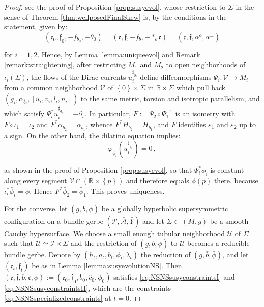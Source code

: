 \documentclass[10pt,reqno,a4paper]{amsart}
\theoremstyle{plain}
\theoremstyle{definition}
\theoremstyle{remark}
\theoremstyle{remark}
\def\cA{\mathcal{A}}
\def\cI{\mathcal{I}}
\def\cP{\mathcal{P}}
\def\frc{\mathfrak{c}}
\def\cU{\mathcal{U}}
\def\fre{\mathfrak{e}}
\renewcommand{\(}{ (}
\renewcommand{\)}{ )}
\newcommand{\frf}{\mathfrak{f}}
\begin{document}
\begin{proof}
\noindent
see the proof of Proposition \ref{prop:susyevol}, whose restriction to $\Sigma$ in the sense of Theorem \ref{thm:wellposedFinalSkew} is, by the conditions in the statement, given by:
\begin{equation*}
(\fre_0,\frf_0,-f_{b_0},-\theta_0) = (\fre,\frf,-f_b,-\ast_{\fre}\frc) = (\fre,\frf,\alpha^o,\alpha^{\perp})    
\end{equation*}

\noindent
for $i = 1,2$. Hence, by Lemma \ref{lemma:uniqueevol} and Remark \ref{remark:straightening}, after restricting $M_1$ and $M_2$ to open neighborhoods of $\iota_i(\Sigma)$, the flows of the Dirac currents $u_i^{\sharp_{g_i}}$ define diffeomorphisms $\Psi_i\colon \mathcal{V}\to M_i$ from a common neighborhood $\mathcal{V}$ of $\left\{ 0\right\}\times\Sigma$ in $\mathbb{R}\times\Sigma$ which pull back $(g_i,\alpha_{\bar{b}_i},[u_i,v_i,l_i,n_i])$ to the same metric, torsion and isotropic parallelism, and which satisfy $\Psi_i^{\ast}u_i^{\sharp_{g_i}} = -\partial_s$. In particular, $F := \Psi_2\circ\Psi_1^{-1}$ is an isometry with $F\circ\iota_1 = \iota_2$ and $F^{\ast}\alpha_{\bar{b}_2} = \alpha_{\bar{b}_1}$, whence $F^{\ast}H_{\bar{b}_2} = H_{\bar{b}_1}$, and $F$ identifies $\varepsilon_1$ and $\varepsilon_2$ up to a sign. On the other hand, the dilatino equation implies:
\begin{equation*}
\varphi_{\bar{\phi}_i}(u_i^{\sharp_{g_i}}) = 0\, ,
\end{equation*}

\noindent
as shown in the proof of Proposition \ref{prop:susyevol}, so that $\Psi_i^{\ast}\bar{\phi}_i$ is constant along every segment $\mathcal{V}\cap(\mathbb{R}\times\left\{ p\right\})$ and therefore equals $\phi(p)$ there, because $\iota_i^{\ast}\bar{\phi}_i = \phi$. Hence $F^{\ast}\bar{\phi}_2 = \bar{\phi}_1$. This proves uniqueness.

\noindent
For the converse, let $(g,\bar{b},\bar{\phi})$ be a globally hyperbolic supersymmetric configuration on a bundle gerbe $(\bar{\cP},\bar{\cA},\bar{Y})$ and let $\Sigma \subset (M,g)$ be a smooth Cauchy hypersurface. We choose a small enough tubular neighborhood $\cU$ of $\Sigma$ such that $\cU\simeq \cI\times \Sigma$ and the restriction of $(g,\bar{b},\bar{\phi})$ to $\cU$ becomes a reducible bundle gerbe. Denote by $(h_t,a_t,b_t,\phi_t,\lambda_t)$ the reduction of $(g,\bar{b},\bar{\phi})$, and let $(\fre_t,\frf_t)$ be as in Lemma \ref{lemma:susyevolutionNS}. Then $(\fre,\frf,b,\frc,\phi) := (\fre_0,\frf_0,b_0,\widehat{c}_0,\phi_0)$ satisfies \eqref{eq:NSNSsusyconstraintsI} and \eqref{eq:NSNSsusyconstraintsII}, which are the constraints \eqref{eq:NSNSspecializedconstraints} at $t = 0$. 
\end{proof}
\end{document}
